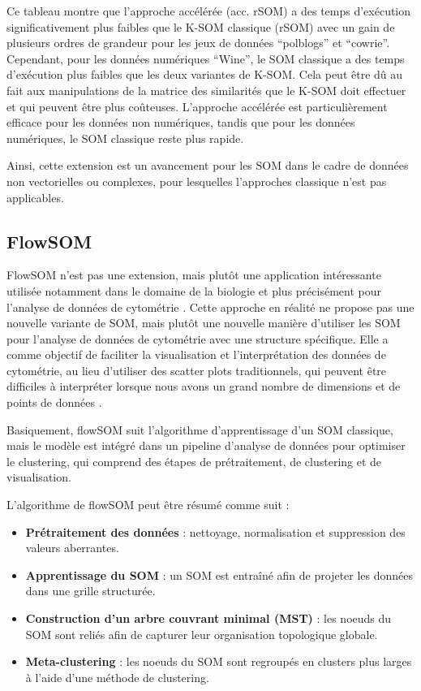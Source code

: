 \documentclass[12pt,a4paper]{report}
\begin{document}
Ce tableau montre que l'approche accélérée (acc. rSOM) a des temps d'exécution significativement plus faibles que le K-SOM classique (rSOM) avec un gain de plusieurs 
ordres de grandeur pour les jeux de données ``polblogs'' et ``cowrie''. Cependant, pour les données numériques ``Wine'', le SOM classique a des temps d'exécution plus faibles que les deux variantes de K-SOM.
Cela peut être dû au fait aux manipulations de la matrice des similarités que le K-SOM doit effectuer et qui peuvent être plus coûteuses.
L'approche accélérée est particulièrement efficace pour les données non numériques, tandis que pour les données numériques, le SOM classique reste plus rapide. 

Ainsi, cette extension est un avancement pour les SOM dans le cadre de données non vectorielles ou complexes, 
pour lesquelles l'approches classique n'est pas applicables.

\subsection{FlowSOM}
FlowSOM n'est pas une extension, mais plutôt une application intéressante utilisée notamment dans le domaine de la biologie et plus précisément pour l'analyse de données de cytométrie \cite{FlowSOM}.
Cette approche en réalité ne propose pas une nouvelle variante de SOM, mais plutôt une nouvelle manière d'utiliser les SOM pour l'analyse de données de cytométrie avec une structure spécifique.
Elle a comme objectif de faciliter la visualisation et l'interprétation des données de cytométrie, au lieu d'utiliser des scatter plots traditionnels, 
qui peuvent être difficiles à interpréter lorsque nous avons un grand nombre de dimensions et de points de données \cite{FlowSOM}.

Basiquement, flowSOM suit l'algorithme d'apprentissage d'un SOM classique, mais le modèle est intégré dans un pipeline d'analyse de données pour optimiser le clustering, 
qui comprend des étapes de prétraitement, de clustering et de visualisation.

L'algorithme de flowSOM peut être résumé comme suit \cite{FlowSOM}:
\begin{itemize}
    \item \textbf{Prétraitement des données} : nettoyage, normalisation et suppression des valeurs aberrantes.
    \item \textbf{Apprentissage du SOM} : un SOM est entraîné afin de projeter les données dans une grille structurée.
    \item \textbf{Construction d'un arbre couvrant minimal (MST)} : les noeuds du SOM sont reliés afin de capturer leur organisation topologique globale.
    \item \textbf{Meta-clustering} : les noeuds du SOM sont regroupés en clusters plus larges à l'aide d'une méthode de clustering.
\end{itemize}
\end{document}
